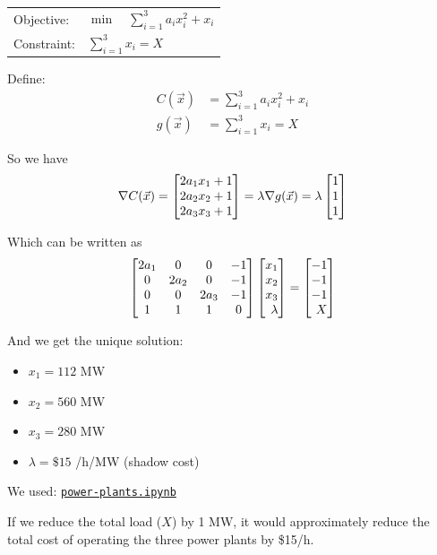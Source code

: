 \documentclass{workbook}
\begin{document}
\begin{solution}
\begin{slide}

\begin{parts}
\setcounter{partsitem}{2}
	\item 	
		\begin{tabular}[t]{ll}
			Objective: 	& $\displaystyle \min \quad \sum_{i=1}^3 a_i x_i^2 + x_i$ \\
			Constraint: & $\displaystyle \sum_{i=1}^3 x_i = X$
		\end{tabular}

	\item Define:
		\begin{align*}
			C(\vec{x}) & = \sum_{i=1}^3 a_i x_i^2 + x_i \\
			g(\vec{x}) & = \sum_{i=1}^3 x_i = X
		\end{align*}
		
		So we have
		\[
			\nabla C (\vec{x}) 
				= \mat{2a_1 x_1 + 1\\2a_2 x_2 + 1\\2a_3 x_3 + 1} 
				= \lambda	\nabla g (\vec{x}) 
				= \lambda \mat{1\\1\\1}
		\]
		
		Which can be written as
		\[ \matc{2a_1 & 0 & 0 & -1\\0 & 2a_2 & 0 & -1\\0 & 0 & 2a_3 & -1 \\ 1 & 1 & 1 & 0} \mat{x_1\\x_2\\x_3\\\lambda} = \mat{-1\\-1\\-1\\ X}
		\]
		
		And we get the unique solution:
		\begin{itemize}
			\item $x_1 = 112$ MW
			\item $x_2 = 560$ MW
			\item $x_3 = 280$ MW
			\item $\lambda = \$15$ /h/MW (shadow cost)
		\end{itemize}
		
		We used: \href{https://utoronto.syzygy.ca/jupyter/user-redirect/git-pull?repo=https://github.com/bigfatbernie/IBLMathModeling&subPath=python/power-plants.ipynb}{\tt power-plants.ipynb}
		
		\item If we reduce the total load ($X$) by 1 MW, it would approximately reduce the total cost of operating the three power plants by \$15/h.
		

\end{parts}
\end{slide}
\end{solution}
\end{document}
